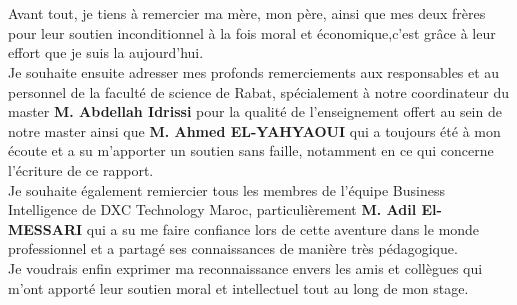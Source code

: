 \titleformat{\chapter}[display]
{\normalfont\huge\bfseries}{\filcenter\underline{\MakeUppercase{{\chaptertitlename}}\ \thechapter}}{20pt}{\Huge}

\titlespacing*{\chapter}{0pt}{1.80in}{0in}
\chapter*{}
\titlespacing*{\chapter}{0pt}{0.45in}{0.3in}%
\vspace{1in}


Avant tout, je tiens à remercier ma mère, mon père, ainsi que mes deux frères pour leur soutien inconditionnel à la fois moral et économique,c’est grâce à leur effort que je suis la aujourd’hui. \\

Je souhaite ensuite adresser mes profonds remerciements aux responsables et au personnel de la faculté de science de Rabat, spécialement à notre coordinateur du master \textbf{M. Abdellah Idrissi} pour la qualité de l’enseignement offert au sein de notre master ainsi que \textbf{M. Ahmed EL-YAHYAOUI} qui a toujours été à mon écoute et a su m’apporter un soutien sans faille, notamment en ce qui concerne l’écriture de ce rapport. \\

Je souhaite également remiercier tous les membres de l’équipe Business Intelligence de DXC Technology Maroc, particulièrement \textbf{M. Adil El-MESSARI} qui a su me faire confiance lors de cette aventure dans le monde professionnel et a partagé ses connaissances de manière très pédagogique.\\ %

Je voudrais enfin exprimer ma reconnaissance envers les amis et collègues qui m’ont apporté leur soutien moral et intellectuel tout au long de mon stage.



